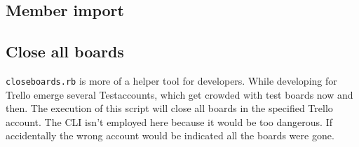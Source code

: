 


\subsection{Member import}


\subsection{Close all boards}
\texttt{closeboards.rb} is more of a helper tool for developers. While developing for Trello emerge several Testaccounts, which get crowded with test boards now and then. The execution of this script will close all boards in the specified Trello account. The CLI isn't employed here because it would be too dangerous. If accidentally the wrong account would be indicated all the boards were gone.

